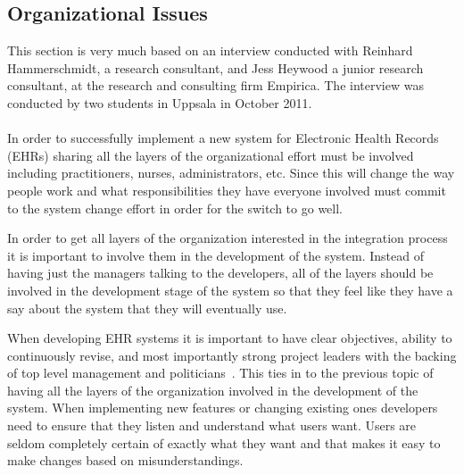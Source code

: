 \documentclass[14pt]{article}
\begin{document}
\subsection{Organizational Issues}
\label{sec:futureOrganizational}
This section is very much based on an interview conducted with Reinhard Hammerschmidt, a research consultant, and Jess Heywood a junior research consultant, at the research and consulting firm Empirica. The interview was conducted by two students in Uppsala in October 2011.
\\\\
In order to successfully implement a new system for Electronic Health Records (EHRs) sharing all the layers of the organizational effort must be involved including practitioners, nurses, administrators, etc. Since this will change the way people work and what responsibilities they have everyone involved must commit to the system change effort in order for the switch to go well.

In order to get all layers of the organization interested in the integration process it is important to involve them in the development of the system. Instead of having just the managers talking to the developers, all of the layers should be involved in the development stage of the system so that they feel like they have a say about the system that they will eventually use.

When developing EHR systems it is important to have clear objectives, ability to continuously revise, and most importantly strong project leaders with the backing of top level management and politicians~\cite{Empirica}. This ties in to the previous topic of having all the layers of the organization involved in the development of the system. When implementing new features or changing existing ones developers need to ensure that they listen and understand what users want. Users are seldom completely certain of exactly what they want and that makes it easy to make changes based on misunderstandings.
\end{document}
